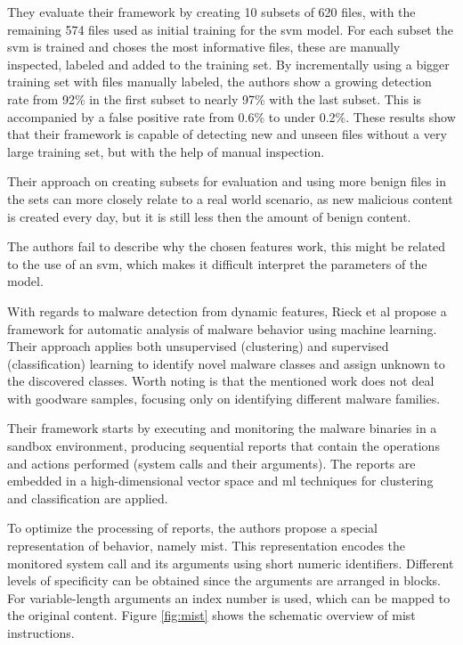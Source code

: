 They evaluate their framework by creating 10 subsets of 620 files, with the remaining 574 files used as initial training for the \gls{svm} model. For each subset the \gls{svm} is trained and choses the most informative files, these are manually inspected, labeled and added to the training set. By incrementally using a bigger training set with files manually labeled, the authors show a growing detection rate from 92\% in the first subset to nearly 97\% with the last subset. This is accompanied by a false positive rate from 0.6\% to under 0.2\%. These results show that their framework is capable of detecting new and unseen files without a very large training set, but with the help of manual inspection.

Their approach on creating subsets for evaluation and using more benign files in the sets can more closely relate to a real world scenario, as new malicious content is created every day, but it is still less then the amount of benign content.

The authors fail to describe why the chosen features work, this might be related to the use of an \gls{svm}, which makes it difficult interpret the parameters of the model.

With regards to malware detection from dynamic features, Rieck et al\cite{rieck:dynamic} propose a framework for automatic analysis of malware behavior using machine learning. Their approach applies both unsupervised (clustering) and supervised (classification) learning to identify novel malware classes and assign unknown to the discovered classes. Worth noting is that the mentioned work does not deal with goodware samples, focusing only on identifying different malware families.

Their framework starts by executing and monitoring the malware binaries in a sandbox environment, producing sequential reports that contain the operations and actions performed (system calls and their arguments). The reports are embedded in a high-dimensional vector space and \gls{ml} techniques for clustering and classification are applied.

To optimize the processing of reports, the authors propose a special representation of behavior, namely \gls{mist}. This representation encodes the monitored system call and its arguments using short numeric identifiers. Different levels of specificity can be obtained since the arguments are arranged in blocks. For variable-length arguments an index number is used, which can be mapped to the original content. Figure \ref{fig:mist} shows the schematic overview of \gls{mist} instructions.

